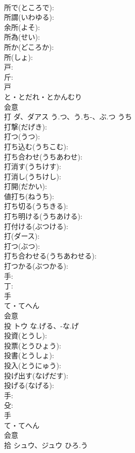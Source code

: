 \documentclass[8pt]{extreport}
\begin{document}
\begin{CJK}{UTF8}{min}
\\	所で(ところで): 
\\	所謂(いわゆる): 
\\	余所(よそ): 
\\	所為(せい): 
\\	所か(どころか): 
\\	所(しょ): 
\\	戸: 
\\	斤: 
\\	戸	
\\	と・とだれ・とかんむり	
\\	会意 
\\	打	ダ、ダアス	う.つ、う.ち-、ぶ.つ	うち	
\\	打撃(だげき): 
\\	打つ(うつ): 
\\	打ち込む(うちこむ): 
\\	打ち合わせ(うちあわせ): 
\\	打消す(うちけす): 
\\	打消し(うちけし): 
\\	打開(だかい): 
\\	値打ち(ねうち): 
\\	打ち切る(うちきる): 
\\	打ち明ける(うちあける): 
\\	打付ける(ぶつける): 
\\	打(ダース): 
\\	打つ(ぶつ): 
\\	打ち合わせる(うちあわせる): 
\\	打つかる(ぶつかる): 
\\	手: 
\\	丁: 
\\	手	
\\	て・てへん	
\\	会意 
\\	投	トウ	な.げる、-な.げ		
\\	投資(とうし): 
\\	投票(とうひょう): 
\\	投書(とうしょ): 
\\	投入(とうにゅう): 
\\	投げ出す(なげだす): 
\\	投げる(なげる): 
\\	手: 
\\	殳: 
\\	手	
\\	て・てへん	
\\	会意 
\\	拾	シュウ、ジュウ	ひろ.う		

\end{CJK}
\end{document}
